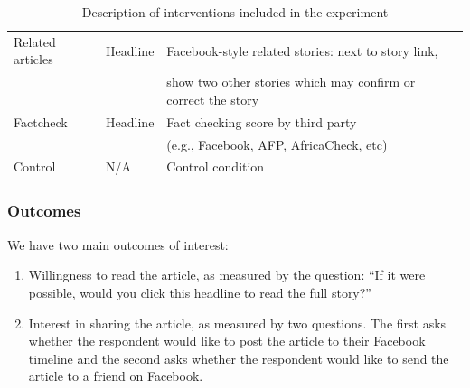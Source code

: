 \documentclass[letterpaper, 12pt, parskip=full, headsepline]{scrartcl}
\begin{document}
\begin{table}[htb!]
\begin{tabular}{l|l|l}
Related articles                                                                                                       & Headline                                                                                                     & Facebook-style related stories: next to story link,\\ & & show two other stories which may confirm or correct the story                                                                                                                                                                                                                                                                                               \\
Factcheck                                                                                                      & Headline                                                                                                     & Fact checking score by third party\\ & & (e.g., Facebook, AFP, AfricaCheck, etc)
 \\
Control                                                                                                        & N/A                                                                                                          & Control condition                                                                                                                                                                                                                                                                                                                                                                                              
\end{tabular}
\caption{Description of interventions included in the experiment}
\label{tab:treatments}
\end{table}



\subsubsection{Outcomes}
We have two main outcomes of interest:

\begin{enumerate}
\item Willingness to read the article, as measured by the question: ``If it were possible, would you click this headline to read the full story?''
\item Interest in sharing the article, as measured by two questions. The first asks whether the respondent would like to post the article to their Facebook timeline and the second asks whether the respondent would like to send the article to a friend on Facebook. 
\end{enumerate}
\end{document}
